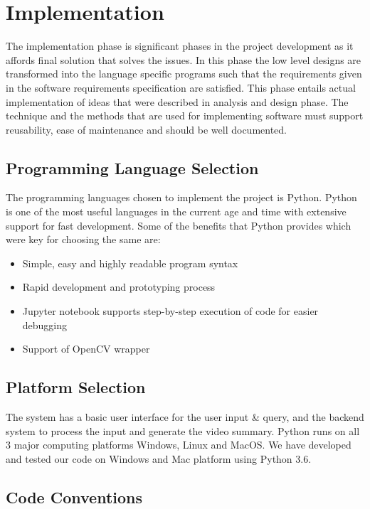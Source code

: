 \chapter{Implementation}

The implementation phase is significant phases in the project development as it affords final solution that solves the issues. In this phase the low level designs are transformed into the language specific programs such that the requirements given in the software requirements specification are satisfied. This phase entails actual implementation of ideas that were described in analysis and design phase. The technique and the methods that are used for implementing software must support reusability, ease of maintenance and should be well documented.

\section{Programming Language Selection}
The programming languages chosen to implement the project is Python. Python is one of the most useful languages in the current age and time with extensive support for fast development. Some of the benefits that Python provides which were key for choosing the same are:

\begin{itemize}
    \item Simple, easy and highly readable program syntax
    \item Rapid development and prototyping process
    \item Jupyter notebook supports step-by-step execution of code for easier debugging
    \item Support of OpenCV wrapper
\end{itemize}


\section{Platform Selection}
The system has a basic user interface for the user input \& query, and the backend system to process the input and generate the video summary. Python runs on all 3 major computing platforms Windows, Linux and MacOS. We have developed and tested our code on Windows and Mac platform using Python 3.6.

\section{Code Conventions}


